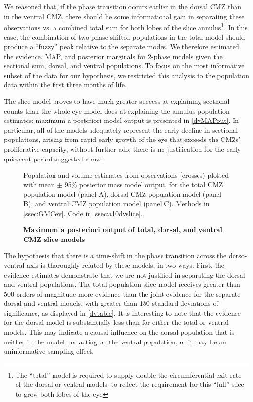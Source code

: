 We reasoned that, if the phase transition occurs earlier in the dorsal CMZ than in the ventral CMZ, there should be some informational gain in separating these observations vs. a combined total sum for both lobes of the slice annulus\footnote{The ``total'' model is required to supply double the circumferential exit rate of the dorsal or ventral models, to reflect the requirement for this ``full'' slice to grow both lobes of the eye}. In this case, the combination of two phase-shifted populations in the total model should produce a ``fuzzy'' peak relative to the separate modes. We therefore estimated the evidence, MAP, and posterior marginals for 2-phase models given the sectional sum, dorsal, and ventral populations. To focus on the most informative subset of the data for our hypothesis, we restricted this analysis to the population data within the first three months of life.

The slice model proves to have much greater success at explaining sectional counts than the whole-eye model does at explaining the annulus population estimates; maximum a posteriori model output is presented in \autoref{dvMAPout}. In particular, all of the models adequately represent the early decline in sectional populations, arising from rapid early growth of the eye that exceeds the CMZs' proliferative capacity, without further ado; there is no justification for the early quiescent period suggested above.

\begin{figure}[!h]
    \caption{{\bf Maximum a posteriori output of total, dorsal, and ventral CMZ slice models}}
    \label{dvMAPout}
    Population and volume estimates from observations (crosses) plotted with mean $\pm$ 95\% posterior mass model output, for the total CMZ population model (panel A), dorsal CMZ population model (panel B), and ventral CMZ population model (panel C).
    Methods in \autoref{ssec:GMCev}.
    Code in \autoref{ssec:a10dvslice}. 
\end{figure}

The hypothesis that there is a time-shift in the phase transition across the dorso-ventral axis is thoroughly refuted by these models, in two ways. First, the evidence estimates demonstrate that we are not justified in separating the dorsal and ventral populations. The total-population slice model receives greater than 500 orders of magnitude more evidence than the joint evidence for the separate dorsal and ventral models, with greater than 180 standard deviations of significance, as displayed in \autoref{dvtable}. It is interesting to note that the evidence for the dorsal model is substantially less than for either the total or ventral models. This may indicate a causal influence on the dorsal population that is neither in the model nor acting on the ventral population, or it may be an uninformative sampling effect. 

